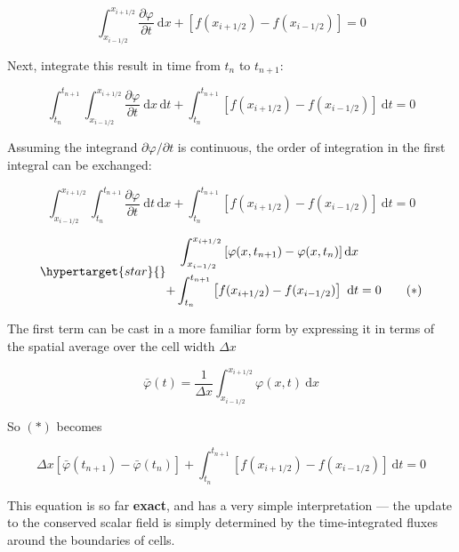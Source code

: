 \documentclass[notoc]{tufte-handout}
\begin{document}
\begin{equation}
\int_{x_{i-1/2}}^{x_{i+1/2}} \frac{\partial \varphi}{\partial t}~\mathrm{d}x + \left[ f(x_{i+1/2}) - f(x_{i-1/2}) \right] = 0
\end{equation}

Next, integrate this result in time from $t_n$ to $t_{n+1}$:

\begin{equation}
\int_{t_n}^{t_{n+1}}\int_{x_{i-1/2}}^{x_{i+1/2}} \frac{\partial \varphi}{\partial t}~\mathrm{d}x\,\mathrm{d}t + \int_{t_n}^{t_{n+1}} \left[ f(x_{i+1/2}) - f(x_{i-1/2}) \right]~\mathrm{d}t = 0
\end{equation}

Assuming the integrand $\partial \varphi / \partial t$ is continuous, the order of integration in the first integral can be exchanged:

\begin{equation}
\int_{x_{i-1/2}}^{x_{i+1/2}}\int_{t_n}^{t_{n+1}} \frac{\partial \varphi}{\partial t}~\mathrm{d}t\,\mathrm{d}x + \int_{t_n}^{t_{n+1}} \left[ f(x_{i+1/2}) - f(x_{i-1/2}) \right]~\mathrm{d}t = 0
\end{equation}

\begin{equation}
\hypertarget{star}{}\begin{split}
\int_{x_{i-1/2}}^{x_{i+1/2}} \left[ \varphi(x,t_{n+1}) - \varphi(x,t_n) \right]\mathrm{d}x & \\
+ \int_{t_n}^{t_{n+1}} \left[ f(x_{i+1/2}) - f(x_{i-1/2}) \right]~\mathrm{d}t & = 0 \qquad (*)
\end{split}
\label{eqn:exact}
\end{equation}

The first term can be cast in a more familiar form by expressing it in terms of the spatial average over the cell width $\Delta x$

\begin{equation}
\bar{\varphi}(t) = \frac{1}{\Delta x}\int_{x_{i-1/2}}^{x_{i+1/2}} \varphi(x,t)~\mathrm{d}x
\end{equation}

So $(*)$ becomes

\begin{equation}
\Delta x \left[ \bar{\varphi}(t_{n+1}) - \bar{\varphi}(t_n) \right] + \int_{t_n}^{t_{n+1}} \left[ f(x_{i+1/2}) - f(x_{i-1/2}) \right]~\mathrm{d}t = 0
\end{equation}

This equation is so far {\bf exact}, and has a very simple interpretation --- the update to the conserved scalar field is simply determined by the time-integrated fluxes around the boundaries of cells.
\end{document}
